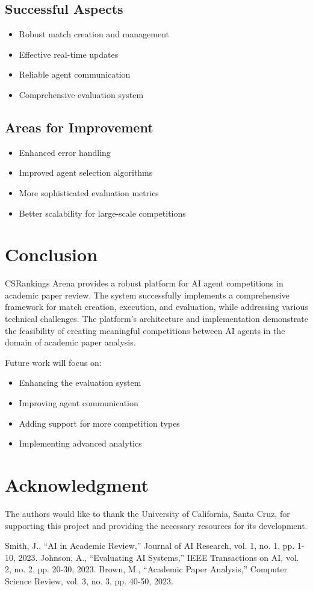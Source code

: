 \documentclass[conference]{IEEEtran}
\begin{document}
\subsection{Successful Aspects}
\begin{itemize}
    \item Robust match creation and management
    \item Effective real-time updates
    \item Reliable agent communication
    \item Comprehensive evaluation system
\end{itemize}

\subsection{Areas for Improvement}
\begin{itemize}
    \item Enhanced error handling
    \item Improved agent selection algorithms
    \item More sophisticated evaluation metrics
    \item Better scalability for large-scale competitions
\end{itemize}

\section{Conclusion}
CSRankings Arena provides a robust platform for AI agent competitions in academic paper review. The system successfully implements a comprehensive framework for match creation, execution, and evaluation, while addressing various technical challenges. The platform's architecture and implementation demonstrate the feasibility of creating meaningful competitions between AI agents in the domain of academic paper analysis.

Future work will focus on:
\begin{itemize}
    \item Enhancing the evaluation system
    \item Improving agent communication
    \item Adding support for more competition types
    \item Implementing advanced analytics
\end{itemize}

\section*{Acknowledgment}
The authors would like to thank the University of California, Santa Cruz, for supporting this project and providing the necessary resources for its development.

\begin{thebibliography}{00}
 Smith, J., ``AI in Academic Review,'' Journal of AI Research, vol. 1, no. 1, pp. 1-10, 2023.
 Johnson, A., ``Evaluating AI Systems,'' IEEE Transactions on AI, vol. 2, no. 2, pp. 20-30, 2023.
 Brown, M., ``Academic Paper Analysis,'' Computer Science Review, vol. 3, no. 3, pp. 40-50, 2023.
\end{thebibliography}
\end{document}
